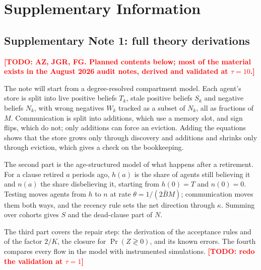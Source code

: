 \documentclass[11pt]{article}
\newcommand{\todo}[1]{\textcolor{red}{\textbf{[TODO: #1]}}}
\begin{document}
\printbibliography


\clearpage
\section*{Supplementary Information}

\subsection*{Supplementary Note 1: full theory derivations}

\todo{AZ, JGR, FG. Planned contents below; most of the material exists in the August 2026 audit notes, derived and validated at $\tau = 10$.}

The note will start from a degree-resolved compartment model. Each agent's store is split into live positive beliefs $T_k$, stale positive beliefs $S_k$ and negative beliefs $N_k$, with wrong negatives $W_k$ tracked as a subset of $N_k$, all as fractions of $M$. Communication is split into additions, which use a memory slot, and sign flips, which do not; only additions can force an eviction. Adding the equations shows that the store grows only through discovery and additions and shrinks only through eviction, which gives a check on the bookkeeping.

The second part is the age-structured model of what happens after a retirement. For a clause retired $a$ periods ago, $h(a)$ is the share of agents still believing it and $n(a)$ the share disbelieving it, starting from $h(0) = T$ and $n(0) = 0$. Testing moves agents from $h$ to $n$ at rate $\theta = 1/(2\bar B M)$; communication moves them both ways, and the recency rule sets the net direction through $\kappa$. Summing over cohorts gives $S$ and the dead-clause part of $N$.

The third part covers the repair step: the derivation of the acceptance rules and of the factor $2/K$, the closure for $\Pr(Z \gtrless 0)$, and its known errors. The fourth compares every flow in the model with instrumented simulations. \todo{redo the validation at $\tau = 1$}
\end{document}
